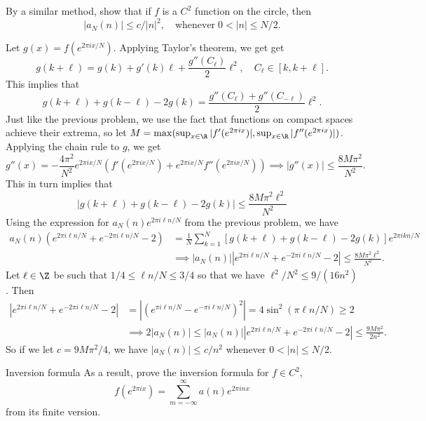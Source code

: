 \documentclass[11pt,letterpaper]{article}
\begin{document}
\begin{problem}
    By a similar method, show that if $f$ is a $C^2$ function on the circle, then
\[
|a_N(n)| \leq c/|n|^2,\quad\text{whenever}\;0<|n| \leq N/2.
\]
\end{problem}
\begin{solution}
    \quad Let $g(x)=f(e^{2\pi i x / N})$. Applying Taylor's theorem, we get get 
    \[
        g(k+\ell) = g(k)+g'(k)\ell+\frac{g''(C_\ell)}{2}\ell^2, \quad C_\ell \in [k, k + \ell]
    .\] 
    This implies that
    \[
        g(k+\ell)+g(k-\ell) - 2g(k) = \frac{g''(C_\ell)+g''(C_{-\ell})}{2}\ell^2
    .\] 
    Just like the previous problem, we use the fact that functions on compact spaces achieve their extrema, so let $M = \max(\sup_{x\in \R}|f'(e^{2\pi i x})|, \sup_{x\in \R}|f''(e^{2\pi i x})|)$. Applying the chain rule to $g$, we get
    \[
        g''(x)=-\frac{4\pi^2}{N^2}e^{2\pi i x / N}\left(f'(e^{2\pi i x / N}) + e^{2\pi i x / N} f''(e^{2\pi i x / N})\right) \implies |g''(x)| \leq \frac{8M\pi^2}{N^2}
    .\] 
    This in turn implies that
    \[
    |g(k+\ell)+g(k-\ell)-2g(k)| \leq \frac{8M\pi^2\ell^2}{N^2}
    \]
    Using the expression for $a_N(n)e^{2\pi i \ell n/N}$ from the previous problem, we have
\[
    \begin{aligned}
a_N(n)(e^{2\pi i \ell n/N}+e^{-2\pi i \ell n/N}-2) &= \frac1N\sum_{k=1}^N [g(k+\ell)+g(k-\ell)-2g(k)]e^{2\pi i kn/N}\\
&\implies |a_N(n)||e^{2\pi i \ell n/N}+e^{-2\pi i \ell n/N}-2| \leq \frac{8M\pi^2\ell^2}{N^2}.
    \end{aligned}
\]
Let $\ell \in \Z$ be such that $1/4 \leq \ell n/N \leq 3/4$ so that we have $\ell^2/N^2 \leq 9/(16n^2)$. Then
\[
    \begin{aligned}
    |e^{2\pi i \ell n/N}+e^{-2\pi i \ell n/N}-2| &= |(e^{\pi i \ell n/N}-e^{-\pi i \ell n/N})^2| = 4\sin^2(\pi \ell n/N) \geq 2\\
    &\implies 2|a_N(n)| \leq |a_N(n)||e^{2\pi i \ell n/N}+e^{-2\pi i \ell n/N}-2| \leq \frac{9M\pi^2}{2n^2}.
    \end{aligned}
\]
So if we let $c=9M\pi^2/4$, we have $|a_N(n)| \leq c/n^2$ whenever $0 < |n| \leq N/2$. 

\begin{partproblem}{Inversion formula}
    As a result, prove the inversion formula for $f \in C^2$,
    \[
    f(e^{2\pi ix}) = \sum_{m=-\infty}^\infty a(n)e^{2\pi i nx}
    \]
    from its finite version.
\end{partproblem}


\end{solution}
\end{document}
